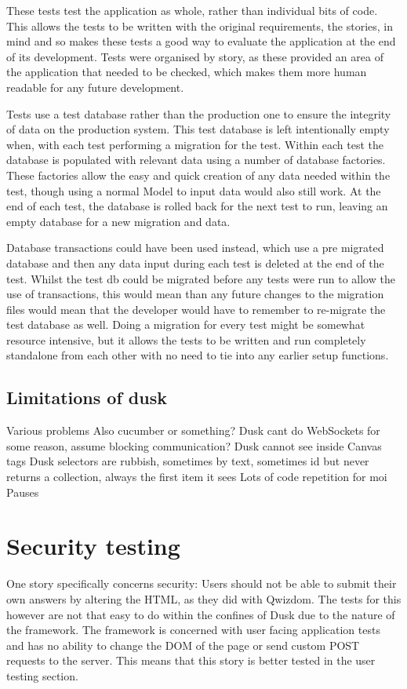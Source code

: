 These tests test the application as whole, rather than individual bits of code. This allows the tests to be written with the original requirements, the stories, in mind and so makes these tests a good way to evaluate the application at the end of its development. Tests were organised by story, as these provided an area of the application that needed to be checked, which makes them more human readable for any future development.

Tests use a test database rather than the production one to ensure the integrity of data on the production system. This test database is left intentionally empty when, with each test performing a migration for the test. Within each test the database is populated with relevant data using a number of database factories. These factories allow the easy and quick creation of any data needed within the test, though using a normal Model to input data would also still work. At the end of each test, the database is rolled back for the next test to run, leaving an empty database for a new migration and data.

Database transactions could have been used instead, which use a pre migrated database and then any data input during each test is deleted at the end of the test. Whilst the test db could be migrated before any tests were run to allow the use of transactions, this would mean than any future changes to the migration files would mean that the developer would have to remember to re-migrate the test database as well. Doing a migration for every test might be somewhat resource intensive, but it allows the tests to be written and run completely standalone from each other with no need to tie into any earlier setup functions. 

\subsection{Limitations of dusk}
Various problems
Also cucumber or something?
Dusk cant do WebSockets for some reason, assume blocking communication?
Dusk cannot see inside Canvas tags
Dusk selectors are rubbish, sometimes by text, sometimes id but never returns a collection, always the first item it sees
Lots of code repetition for moi
Pauses

\section{Security testing}
One story specifically concerns security: Users should not be able to submit their own answers by altering the HTML, as they did with Qwizdom. The tests for this however are not that easy to do within the confines of Dusk due to the nature of the framework. The framework is concerned with user facing application tests and has no ability to change the DOM of the page or send custom POST requests to the server. This means that this story is better tested in the user testing section.

